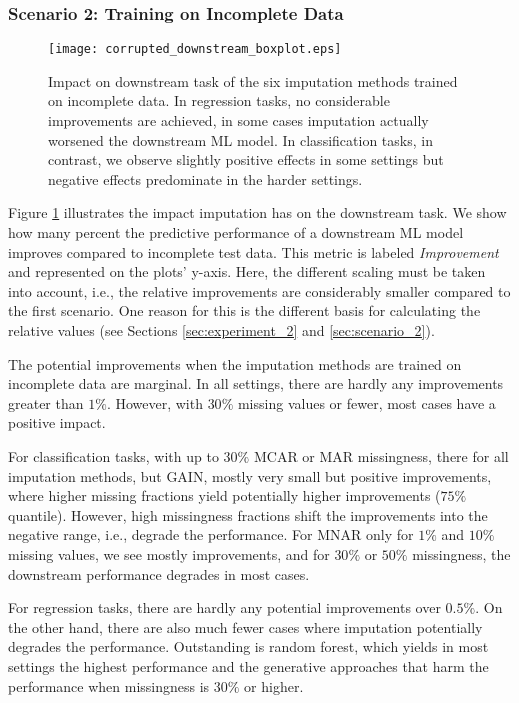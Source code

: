 \subsubsection{Scenario 2: Training on Incomplete Data}

\begin{figure}\centering
	\texttt{[image: corrupted\_downstream\_boxplot.eps]}

	\caption[Downstream Ranks - Corrupted]{Impact on downstream task of the six imputation methods trained on incomplete data. In regression tasks, no considerable improvements are achieved, in some cases imputation actually worsened the downstream ML model. In classification tasks, in contrast, we observe slightly positive effects in some settings but negative effects predominate in the harder settings.
    }
	\label{fig:corrupted_downstream_boxplot}
\end{figure}


Figure \ref{fig:corrupted_downstream_boxplot} illustrates the impact imputation has on the downstream task. We show how many percent the predictive performance of a downstream ML model improves compared to incomplete test data. This metric is labeled \textit{Improvement} and represented on the plots' y-axis. Here, the different scaling must be taken into account, i.e., the relative improvements are considerably smaller compared to the first scenario. One reason for this is the different basis for calculating the relative values (see Sections \ref{sec:experiment_2} and \ref{sec:scenario_2}).

The potential improvements when the imputation methods are trained on incomplete data are marginal. In all settings, there are hardly any improvements greater than $1\%$. However, with $30\%$ missing values or fewer, most cases have a positive impact.

For classification tasks, with up to $30\%$ MCAR or MAR missingness, there for all imputation methods, but GAIN, mostly very small but positive improvements, where higher missing fractions yield potentially higher improvements ($75\%$ quantile). However, high missingness fractions shift the improvements into the negative range, i.e., degrade the performance. For MNAR only for $1\%$ and $10\%$ missing values, we see mostly improvements, and for $30\%$ or $50\%$ missingness, the downstream performance degrades in most cases.

For regression tasks, there are hardly any potential improvements over $0.5\%$. On the other hand, there are also much fewer cases where imputation potentially degrades the performance. Outstanding is random forest, which yields in most settings the highest performance and the generative approaches that harm the performance when missingness is $30\%$ or higher.

